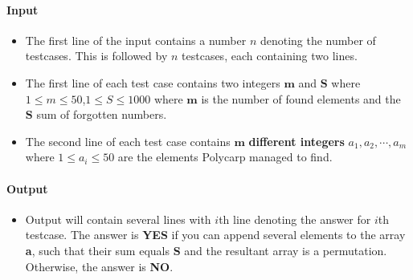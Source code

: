 \documentclass[a4paper]{exam}
\begin{document}
\begin{questions}
\begin{itemize}
    \end{itemize}


    \paragraph{Input}

    \begin{itemize}
        \item The first line of the input contains a number $n$ denoting the number of testcases. This is followed by $n$ testcases, each containing two lines.
        \item The first line of each test case contains two integers $\mathbf{m}$ and $\mathbf{S}$ where $ 1 \leq m \leq 50 $,$1 \leq S \leq 1000 $ where $\mathbf{m}$ is the number of found elements
        and the $\mathbf{S}$ sum of forgotten numbers.
        \item The second line of each test case contains $\mathbf{m}$ \textbf{different integers} $a_1,a_2, \cdots, a_m$ where $1 \leq a_i \leq 50$ are the elements Polycarp managed to find.
    \end{itemize}

    \paragraph{Output}
    \begin{itemize}
        \item Output will contain several lines with $i$th line denoting the answer for $i$th testcase. The answer is \textbf{YES} if you can append several elements to the array \textbf{a}, such that their sum equals $\mathbf{S}$ and the resultant array is a permutation. Otherwise, the answer is \textbf{NO}.
    \end{itemize}


\end{questions}
\end{document}
